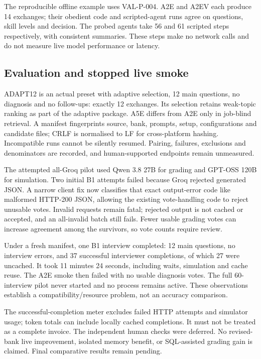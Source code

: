 The reproducible offline example uses VAL-P-004. A2E and A2EV each produce 14 exchanges;
their obedient code and scripted-agent runs agree on questions, skill levels and decision.
The probed agents take 56 and 61 scripted steps respectively, with consistent summaries.
These steps make no network calls and do not measure live model performance or latency.

\subsection{Evaluation and stopped live smoke}
ADAPT12 is an actual preset with adaptive selection, 12 main questions, no diagnosis and no
follow-ups: exactly 12 exchanges. Its selection retains weak-topic ranking as part of the
adaptive package. A5E differs from A2E only in job-blind retrieval. A manifest fingerprints
source, bank, prompts, setup, configurations and candidate files; CRLF is normalised to LF for
cross-platform hashing. Incompatible runs cannot be silently resumed. Pairing, failures,
exclusions and denominators are recorded, and human-supported endpoints remain unmeasured.

The attempted all-Groq pilot used Qwen 3.8 27B for grading and GPT-OSS 120B for simulation.
Two initial B1 attempts failed because Groq rejected generated JSON. A narrow client fix now
classifies that exact output-error code like malformed HTTP-200 JSON, allowing the existing
vote-handling code to reject unusable votes. Invalid requests remain fatal; rejected output
is not cached or accepted, and an all-invalid batch still fails. Fewer usable grading votes
can increase agreement among the survivors, so vote counts require review.

Under a fresh manifest, one B1 interview completed: 12 main questions, no interview errors,
and 37 successful interviewer completions, of which 27 were uncached. It took 11 minutes
24 seconds, including waits, simulation and cache reuse. The A2E smoke then failed with no
usable diagnosis votes. The full 60-interview pilot never started and no process remains active.
These observations establish a compatibility/resource problem, not an accuracy comparison.

The successful-completion meter excludes failed HTTP attempts and simulator usage; token
totals can include locally cached completions. It must not be treated as a complete invoice.
The independent human checks were deferred. No revised-bank live improvement, isolated memory
benefit, or SQL-assisted grading gain is claimed. Final comparative results remain pending.
